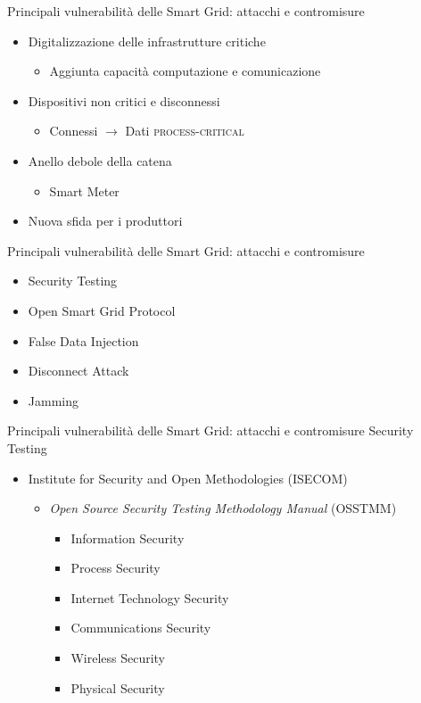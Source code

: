

\begin{frame}{Principali vulnerabilità delle Smart Grid: attacchi e contromisure}
	\begin{itemize}[<+- | alert@+>]
		\item Digitalizzazione delle infrastrutture critiche
		\begin{itemize}
			\item Aggiunta capacità computazione e comunicazione
		\end{itemize}
		\item Dispositivi non critici e disconnessi
		\begin{itemize}
			\item Connessi $\rightarrow$ Dati \textsc{process-critical}
		\end{itemize}
		\item Anello debole della catena
		\begin{itemize}
			\item Smart Meter
		\end{itemize}
		\item Nuova sfida per i produttori
	\end{itemize}
\end{frame}

\begin{frame}{Principali vulnerabilità delle Smart Grid: attacchi e contromisure}
	\begin{itemize}[<+- | alert@+>]
		\item Security Testing
		\item Open Smart Grid Protocol
		\item False Data Injection
		\item Disconnect Attack
		\item Jamming
	\end{itemize}
\end{frame}

\begin{frame}{Principali vulnerabilità delle Smart Grid: attacchi e contromisure}
Security Testing
	\begin{itemize}[<+- | alert@+>]
		\item Institute for Security and Open Methodologies (ISECOM)
		\begin{itemize}
			\item \textit{Open Source Security Testing Methodology Manual} (OSSTMM)
			\begin{itemize}
				\item Information Security
				\item Process Security
				\item \alert<9>{Internet Technology Security}
				\item Communications Security
				\item Wireless Security
				\item Physical Security
			\end{itemize}
		\end{itemize}
	\end{itemize}
\end{frame}

